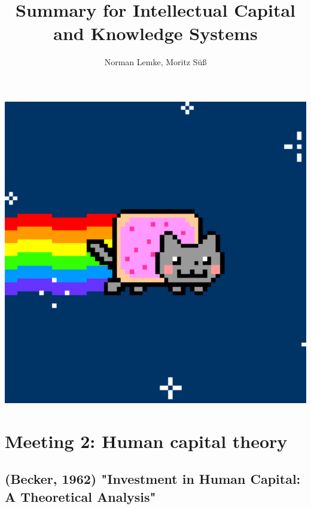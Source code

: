 \documentclass[12pt,a4paper]{article}
\author{Norman Lemke, Moritz Süß}
\begin{document}
  \title{Summary for Intellectual Capital and Knowledge Systems}
  \maketitle
  \begin{center}
    \includegraphics[width=16cm]{cover.pdf}
  \end{center}
  \thispagestyle{empty}
  \pagebreak
  \tableofcontents
  \thispagestyle{empty}
  \pagebreak

  \section{Meeting 2: Human capital theory} %
  \subsection{(Becker, 1962) "Investment in Human Capital: A Theoretical Analysis"} %
  \label{prt:Becker}

\end{document}
